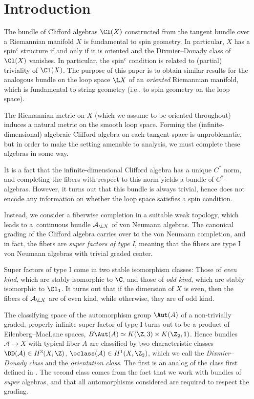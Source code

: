 \section{Introduction}

The bundle of Clifford algebras $\Cl(X)$ constructed from the tangent bundle over a Riemannian manifold $X$ is fundamental to spin geometry.
In particular, $X$ has a spin$^c$ structure if and only if it is oriented and the Dixmier--Douady class of $\Cl(X)$ vanishes.
In particular, the spin$^c$ condition is related to (partial) triviality of $\Cl(X)$.
The purpose of this paper is to obtain similar results for the analogous bundle on the loop space $\L X$ of an \emph{oriented} Riemannian manifold, which is fundamental to string geometry (i.e., to spin geometry on the loop space).

The Riemannian metric on $X$ (which we assume to be oriented throughout) induces a natural metric on the smooth loop space.
Forming the (infinite-dimensional) algebraic Clifford algebra on each tangent space is unproblematic, but in order to make the setting amenable to analysis, we must complete these algebras in some way.

It is a fact that the infinite-dimensional Clifford algebra has a unique $C^*$ norm, and completing the fibers with respect to this norm yields a bundle of $C^*$-algebras.
However, it turns out that this bundle is always trivial, hence does not encode any information on whether the loop space satisfies a spin condition.

Instead, we consider a fiberwise completion in a suitable weak topology, which leads to a~continuous bundle $\mathcal{A}_{\L X}$ of von Neumann algebras.
The canonical grading of the Clifford algebra carries over to the von Neumann completion, and in fact, the fibers are \emph{super factors of type I}, meaning that the fibers are type I von Neumann algebras with trivial graded center.

Super factors of type I come in two stable isomorphism classes:
Those of \emph{even kind}, which are stably isomorphic to $\C$, and those of \emph{odd kind}, which are stably isomorphic to $\Cl_1$.
It turns out that if the dimension of $X$ is even, then the fibers of $\mathcal{A}_{\L X}$ are of even kind, while otherwise, they are of odd kind.

The classifying space of the automorphism group $\Aut(A)$ of a non-trivially graded, properly infinite super factor of type I turns out to be a product of Eilenberg--MacLane spaces, $B\Aut(A) \simeq K(\Z, 3) \times K(\Z_2, 1)$.
Hence bundles $\mathcal{A} \to X$ with typical fiber $A$ are classified by two characteristic classes
$
\DD(\mathcal{A}) \in H^3(X, \Z)$, $\oclass(\mathcal{A}) \in H^1(X, \Z_2)$,
which we call the \emph{Dixmier--Douady class} and the \emph{orientation class}.
The first is an analog of the class first defined in \cite{DixmierDouady}.
The second class comes from the fact that we work with bundles of \emph{super} algebras, and that all automorphisms considered are required to respect the grading.

